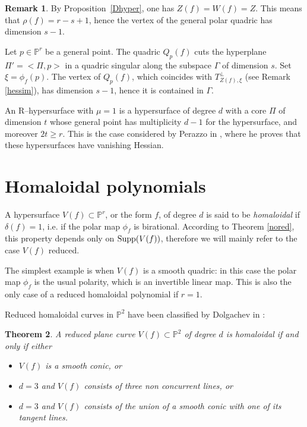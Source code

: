 \documentclass[11pt]{article}   %
\newtheorem{Theorem}{Theorem}
\theoremstyle{definition}
\newtheorem{Remark}[Theorem]{Remark}
\numberwithin{Theorem}{section} \numberwithin{equation}{section}
\newcommand{\p}{{\mathbb P}}
\begin{document}
{\begin{Remark}
By  Proposition~\ref {Dhyper}, one has  $Z(f)=W(f)=Z$. This means
that $\rho(f)=r-s+1$,  hence the vertex of the general polar quadric
has dimension $s-1$.

Let $p\in \p^ r$ be a general point. The quadric $Q_p(f)$ cuts the
hyperplane $\Pi'=<\Pi,p>$ in a quadric singular along the subspace
$\Gamma$ of dimension $s$.  Set $\xi=\phi_f(p)$. The vertex
of $Q_p(f)$, which coincides with $T_{Z(f),\xi}^ \perp$
(see Remark \ref {hessim}), has dimension $s-1$,
hence it is  contained in $\Gamma$.  \end{Remark}

An R--hypersurface with $\mu=1$ is a hypersurface of degree $d$ with
a core  $\Pi$ of dimension $t$ whose general point has multiplicity
$d-1$ for the hypersurface, and moreover $2t\geq r$. This is the
case considered by Perazzo in \cite[p. 343]{Perazzo}, where he
proves that these hypersurfaces have vanishing Hessian.




\section{Homaloidal polynomials}\label {homal}

A hypersurface $V(f)\subset \p^ r$, or the form $f$, of degree $d$
is said to be {\it homaloidal} if $\delta(f)=1$, i.e. if the polar
map $\phi_f$ is birational. According to Theorem \ref {nored}, this
property depends only on ${\rm Supp}(V(f))$, therefore we will
mainly refer to the case $V(f)$ reduced.

The simplest example is when $V(f)$ is a smooth quadric: in this
case the polar map $\phi_f$ is the usual polarity, which is an
invertible linear map. This is also the only case of a reduced
homaloidal polynomial if $r=1$.

Reduced homaloidal curves in $\p^ 2$ have been classified by
Dolgachev in \cite {Dolgachev}:

\begin{Theorem}\label {dolgclass}  A reduced plane curve $V(f)\subset \p^ 2$
of degree $d$ is homaloidal if and only if either
\begin {itemize}
\item[{\rm (i)}]  $V(f)$ is a smooth conic, or
\item[{\rm (ii)}] $d=3$ and $V(f)$ consists of three non concurrent lines, or
\item[{\rm (iii)}] $d=3$ and $V(f)$ consists of the union of a smooth conic
with one of its tangent lines.
\end {itemize}
\end{Theorem}

}
\end{document}
